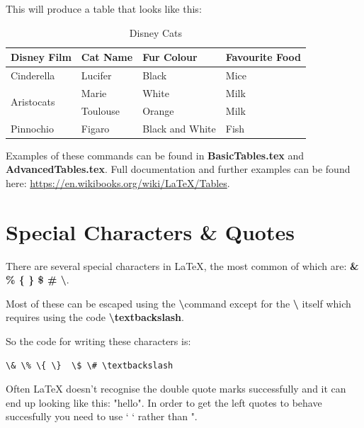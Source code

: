 \documentclass[10pt, titlepage]{article}
\begin{document}
\newpage
This will produce a table that looks like this:\\
\begin{table}[ht]
\begin{center}
\begin{tabular}{ p{90pt} | p{90pt} | p{90pt} | p{90pt}} 
Disney Film 			& Cat Name 	& Fur Colour 		& Favourite Food	\\ \hline
Cinderella 			& Lucifer 	& Black 		& Mice 			\\ \hline
\multirow{2}{*}{Aristocats} 	& Marie 	& White 		& Milk			\\\cline{2-4}
				& Toulouse 	& Orange 		& Milk			\\ \hline
Pinnochio 			& Figaro	& Black and White 	& Fish 			\\ \hline
\end{tabular}
\caption{Disney Cats}
\label{tab:table1}
\end{center}
\end{table}

Examples of these commands can be found in \textbf{BasicTables.tex} and \textbf{AdvancedTables.tex}. Full documentation and further examples can be found here: \url{https://en.wikibooks.org/wiki/LaTeX/Tables}. 

\section{Special Characters \& Quotes}
There are several special characters in LaTeX, the most common of which are:  \textbf{\& \% \{ \}  \$ \# \textbackslash}. 

Most of these can be escaped using the \textbf{\textbackslash }command except for the \textbf{\textbackslash} itself which requires using the code \textbf{\textbackslash textbackslash}. 

So the code for writing these characters is: 
\begin{lstlisting}
\& \% \{ \}  \$ \# \textbackslash 
\end{lstlisting}

Often LaTeX doesn't recognise the double quote marks successfully and it can end up looking like this: "hello". In order to get the left quotes to behave succesfully you need to use ` ` rather than ".
\end{document}
